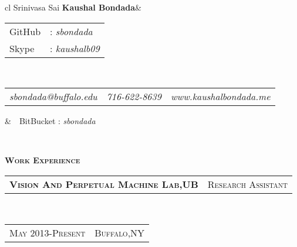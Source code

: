 \documentclass[10pt,a4paper,oneside]{article}
\begin{document}
    \begin{center}
        \begin{tabular}{cl}
            {\Huge \textmd{Srinivasa Sai} \textbf{Kaushal Bondada}}&\begin{tabular}{ll}
                                                                        \textcolor{light-gray}{GitHub}&: \textit{sbondada}\\[0.1cm]
                                                                        \textcolor{light-gray}{Skype}&: \textit{kaushalb09}
                                                                    \end{tabular}\\[0.35cm]
            \begin{tabular}{c|c|c}
                \textit{sbondada@buffalo.edu}&\textit{716-622-8639}&\textit{www.kaushalbondada.me} 
            \end{tabular}                                          &\ \ \textcolor{light-gray}{BitBucket} : \textit{sbondada}
        \end{tabular}\\[0.6cm]
        \textcolor{light-gray}{\hrulefill} 
    \end{center} 
    \vspace{0pt}
    \vspace{0pt}
    \textcolor{light-gray}{\textbf{\large W\textsc{ork} E\textsc{xperience}}}
    \vspace{10pt}\\
    \begin{tabular}{c|c}
        \textbf{\normalsize V\textsc{ision} A\textsc{nd} P\textsc{erpetual} M\textsc{achine} L\textsc{ab},UB}
        &\textmd{\normalsize R\textsc{esearch} A\textsc{ssistant}}
    \end{tabular}\\
    \textcolor{light-gray}{
        \begin{tabular}{c|c}
            {\small M\textsc{ay 2013}-P\textsc{resent}}
           &{\small B\textsc{uffalo},NY}
        \end{tabular}
    }\\ 
    \vspace{-4mm}
\end{document}
